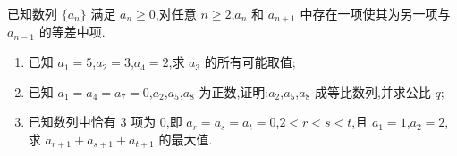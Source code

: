 \begin{problem}
已知数列 \(\{a_n\}\) 满足 \(a_n\ge0\),对任意 \(n\ge2\),\(a_n\) 和 \(a_{n+1}\) 中存在一项使其为另一项与 \(a_{n-1}\) 的等差中项.
\begin{enumerate}
\item 已知 \(a_1=5\),\(a_2=3\),\(a_4=2\),求 \(a_3\) 的所有可能取值;
\item 已知 \(a_1=a_4=a_7=0\),\(a_2\),\(a_5\),\(a_8\) 为正数,证明:\(a_2\),\(a_5\),\(a_8\) 成等比数列,并求公比 \(q\);
\item 已知数列中恰有 \(3\) 项为 \(0\),即 \(a_r=a_s=a_t=0\),\(2<r<s<t\),且 \(a_1=1\),\(a_2=2\),求 \(a_{r+1}+a_{s+1}+a_{t+1}\) 的最大值.
\end{enumerate}
\end{problem}

